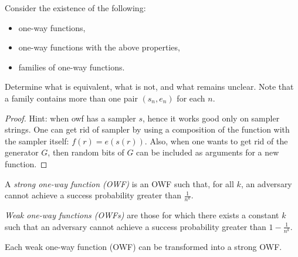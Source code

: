 \begin{exercise}
    Consider the existence of the following:
    \begin{itemize}
        \item one-way functions,
        \item one-way functions with the above properties,
        \item families of one-way functions.
    \end{itemize}
    Determine what is equivalent, what is not, and what remains unclear.
    Note that a family contains more than one pair $(s_n, e_n)$ for each $n$.
\end{exercise}
\begin{proof}
	Hint: when owf has a sampler $s$, hence it works good only on sampler strings.
	One can get rid of sampler by using a composition of the function with the sampler itself:  $f(r) = e(s(r))$.
	Also, when one wants to get rid of the generator $G$, then random bits of $G$ can be included as arguments for a new function.
\end{proof}

\begin{definition}
    A \emph{strong one-way function (OWF)} is an OWF such that, for all $k$, an adversary cannot achieve a success probability greater than $\frac{1}{n^k}$.

    \emph{Weak one-way functions (OWFs)} are those for which there exists a constant $k$ such that an adversary cannot achieve a success probability greater than $1 - \frac{1}{n^{k}}$.
\end{definition}

\begin{theorem}
    Each weak one-way function (OWF) can be transformed into a strong OWF.
\end{theorem}

